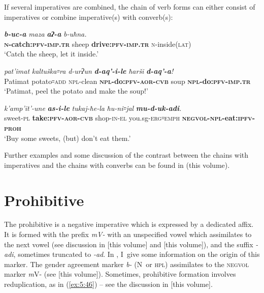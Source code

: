 ﻿\documentclass[output=paper]{langsci/langscibook}
\begin{document}

If several imperatives are combined, the chain of verb forms can either
consist of imperatives or combine imperative(s) with converb(s):

\ea %
\gll \emph{\textbf{b-uc-a}} \emph{maza} \emph{\textbf{aʔ-a}} \emph{b-uħna.}\\
 \textbf{\textsc{n}-catch:\textsc{pfv}-\textsc{imp}.\textsc{tr}} sheep \textbf{drive:\textsc{pfv}-\textsc{imp}.\textsc{tr}}  \textsc{n}-inside(\textsc{lat})\\
\glt `Catch the sheep, let it inside.'

\ex %
\gll \emph{pat'imat} \emph{kaltuška꞊ra} \emph{d-urʔun}  \emph{\textbf{d-aq'-i-le}} \emph{ħarši}  \emph{\textbf{d-aq'-a}!}\\
 Patimat potato꞊\textsc{add} \textsc{npl}-clean \textbf{\textsc{npl}-do:\textsc{pfv}-\textsc{aor}-\textsc{cvb}} soup  \textbf{\textsc{npl}-do:\textsc{pfv}-\textsc{imp}.\textsc{tr}}\\
\glt `Patimat, peel the potato and make the soup!'

\ex %
\gll \emph{k'amp'it'-une} \emph{\textbf{as-i-le}}  \emph{tukaj-ħe-la} \emph{ħu-ni꞊jal} \emph{\textbf{mu-d-uk-adi}.}\\
 sweet-\textsc{pl} \textbf{take:\textsc{pfv}-\textsc{aor}-\textsc{cvb}} shop-\textsc{in}-\textsc{el}  you.sg-\textsc{erg}꞊\textsc{emph} \textbf{\textsc{negvol}-\textsc{npl}-eat:\textsc{ipfv}-\textsc{proh}}\\
\glt `Buy some sweets, (but) don't eat them.'
\z

Further examples and some discussion of the contrast between the chains
with imperatives and the chains with converbs can be found in \citet{kustova2019}
(this volume).

\removelastskip
{}

\section{Prohibitive}\label{prohibitive}


The prohibitive is a negative imperative which is expressed by a
dedicated affix. It is formed with the prefix \emph{mV-} with an
unspecified vowel which assimilates to the next vowel (see discussion in
\citealt{moroz2019} [this volume] and \citealt{daniel2019} [this volume]), and the suffix
\emph{-adi}, sometimes truncated to \emph{-ad}. In , I~give
some information on the origin of this marker. The gender agreement
marker \emph{b-} (N~or \textsc{hpl}) assimilates to the \textsc{negvol} marker
\emph{m}V- (see \citealt{moroz2019} [this volume]). Sometimes, prohibitive formation
involves reduplication, as in (\ref{ex:5:46}) – see the discussion in \citet{daniel2019} [this
volume].
\end{document}
